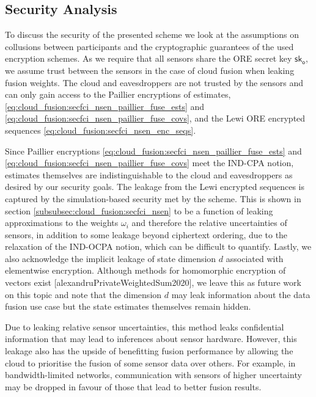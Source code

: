 % 
% 

\subsection{Security Analysis}\label{subsec:cloud_fusion:secfci_security}
To discuss the security of the presented scheme we look at the assumptions on collusions between participants and the cryptographic guarantees of the used encryption schemes. As we require that all sensors share the ORE secret key $\mathsf{sk}_{\mathsf{o}}$, we assume trust between the sensors in the case of cloud fusion when leaking fusion weights. The cloud and eavesdroppers are not trusted by the sensors and can only gain access to the Paillier encryptions of estimates, \eqref{eq:cloud_fusion:secfci_nsen_paillier_fuse_ests} and \eqref{eq:cloud_fusion:secfci_nsen_paillier_fuse_covs}, and the Lewi ORE encrypted sequences \eqref{eq:cloud_fusion:secfci_nsen_enc_seqs}.

Since Paillier encryptions \eqref{eq:cloud_fusion:secfci_nsen_paillier_fuse_ests} and \eqref{eq:cloud_fusion:secfci_nsen_paillier_fuse_covs} meet the IND-CPA notion, estimates themselves are indistinguishable to the cloud and eavesdroppers as desired by our security goals. The leakage from the Lewi encrypted sequences is captured by the simulation-based security met by the scheme. This is shown in section \ref{subsubsec:cloud_fusion:secfci_nsen} to be a function of leaking approximations to the weights $\omega_i$ and therefore the relative uncertainties of sensors, in addition to some leakage beyond ciphertext ordering, due to the relaxation of the IND-OCPA notion, which can be difficult to quantify. Lastly, we also acknowledge the implicit leakage of state dimension $d$ associated with elementwise encryption. Although methods for homomorphic encryption of vectors exist [alexandruPrivateWeightedSum2020], we leave this as future work on this topic and note that the dimension $d$ may leak information about the data fusion use case but the state estimates themselves remain hidden.

Due to leaking relative sensor uncertainties, this method leaks confidential information that may lead to inferences about sensor hardware. However, this leakage also has the upside of benefitting fusion performance by allowing the cloud to prioritise the fusion of some sensor data over others. For example, in bandwidth-limited networks, communication with sensors of higher uncertainty may be dropped in favour of those that lead to better fusion results.

